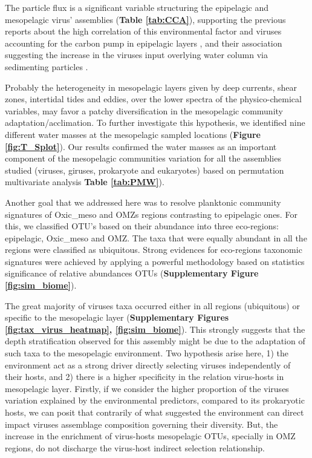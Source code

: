 \documentclass[fleqn,10pt]{wlscirep}
\begin{document}
The particle flux is a significant variable structuring the epipelagic and mesopelagic virus’ assemblies (\textbf{Table \ref{tab:CCA}}), supporting the previous reports about the high correlation of this environmental factor and viruses accounting for the carbon pump in epipelagic layers \cite{guidi_plankton_2016}, and their association suggesting the increase in the viruses input overlying water column via sedimenting particles \cite{parada_viral_2007}.

Probably the heterogeneity in mesopelagic layers given by deep currents, shear zones, intertidal tides and eddies, over the lower spectra of the physico-chemical variables, may favor a patchy diversification in the mesopelagic community adaptation/acclimation. To further investigate this hypothesis, we identified nine different water masses at the mesopelagic sampled locations (\textbf{Figure \ref{fig:T_Splot}}). Our results confirmed the water masses as an important component of the mesopelagic communities variation for all the assemblies studied (viruses, giruses, prokaryote and eukaryotes) based on permutation multivariate analysis \textbf{Table \ref{tab:PMW}}).

Another goal that we addressed here was to resolve planktonic community signatures of Oxic\_meso and OMZs regions contrasting to epipelagic ones. For this, we classified OTU’s based on their abundance into three eco-regions: epipelagic, Oxic\_meso and OMZ. The taxa that were equally abundant in all the regions were classified as ubiquitous. Strong evidences for eco-regions taxonomic signatures were achieved by applying a powerful methodology based on statistics significance of relative abundances OTUs (\textbf{Supplementary Figure \ref{fig:sim_biome}}).

The great majority of viruses taxa occurred either in all regions (ubiquitous) or specific to the mesopelagic layer (\textbf{Supplementary Figures \ref{fig:tax_virus_heatmap}, \ref{fig:sim_biome}}). This strongly suggests that the depth stratification observed for this assembly might be due to the adaptation of such taxa to the mesopelagic environment. Two hypothesis arise here, 1) the environment act as a strong driver directly selecting viruses independently of their hosts, and 2) there is a higher specificity in the relation virus-hosts in mesopelagic layer. Firstly, if we consider the higher proportion of the viruses variation explained by the environmental predictors, compared to its prokaryotic hosts, we can posit that contrarily of what suggested the environment can direct impact viruses assemblage composition governing their diversity. But, the increase in the  enrichment of virus-hosts mesopelagic OTUs, specially in OMZ regions, do not discharge the virus-host indirect selection relationship. %
\end{document}
